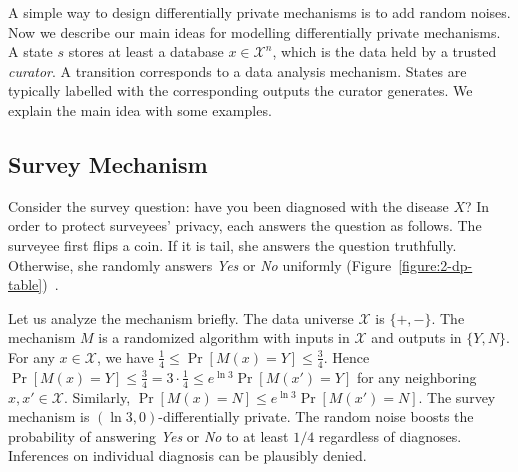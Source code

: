 A simple way to design differentially private mechanisms is to add
random noises.
Now we describe our main ideas for  modelling differentially private mechanisms.
A state $s$ stores at least a database $x\in \mathcal{X}^n$, which is the data held by a trusted \emph{curator}. A transition corresponds to a data analysis mechanism.
States are typically labelled with the corresponding outputs
the curator generates. We explain the main idea with some examples.

\subsection{Survey Mechanism}
\label{subsec:survey}

Consider the survey question: have you been diagnosed
with the disease $X$? In order to protect surveyees' privacy, each
answers the question as follows. The surveyee first flips a
coin. If it is tail, she answers the question truthfully. Otherwise,
she randomly answers \textit{Yes} or \textit{No}
uniformly (Figure~\ref{figure:2-dp-table})~\cite{DR:14:AFDP}.

Let us analyze the mechanism briefly. The data universe $\mathcal{X}$
is $\{ +, - \}$. The mechanism $M$ is a randomized algorithm with
inputs in $\mathcal{X}$ and outputs in $\{ Y, N \}$. For any $x \in
\mathcal{X}$, we have $\frac{1}{4} \leq \Pr[M (x) = Y] \leq
\frac{3}{4}$. Hence $\Pr[M (x) = Y] \leq \frac{3}{4} = 3 \cdot
\frac{1}{4} \leq e^{\ln 3} \Pr[M (x') = Y]$ for any neighboring $x, x'
\in \mathcal{X}$. Similarly, $\Pr[M (x) = N] \leq e^{\ln 3} \Pr[M (x')
= N]$. The survey mechanism is $(\ln 3, 0)$-differentially private.
The random noise boosts the probability of answering
\textit{Yes} or \textit{No} to at least $1/4$ regardless of
diagnoses. Inferences on individual diagnosis can be plausibly denied.

